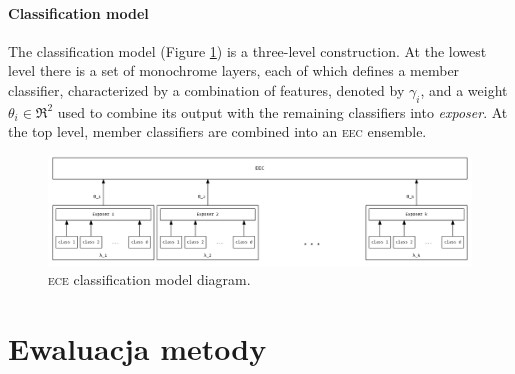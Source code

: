 \documentclass[]{article}
\begin{document}
\paragraph{Classification model}

The classification model (Figure \ref{fig:model}) is a three-level construction. At the lowest level there is a set of monochrome layers, each of which defines a member classifier, characterized by a combination of features, denoted by $\gamma_i$, and a weight $\theta_i \in \Re^2$ used to combine its output with the remaining classifiers into \emph{exposer}. At the top level, member classifiers are combined into an \textsc{eec} ensemble.

\begin{figure}[hbt]
	\center
  \includegraphics[width=\textwidth]{figures/ece_model}
  
  \caption{\textsc{ece} classification model diagram.}
	\label{fig:model}
\end{figure}

\section{Ewaluacja metody}
\end{document}
